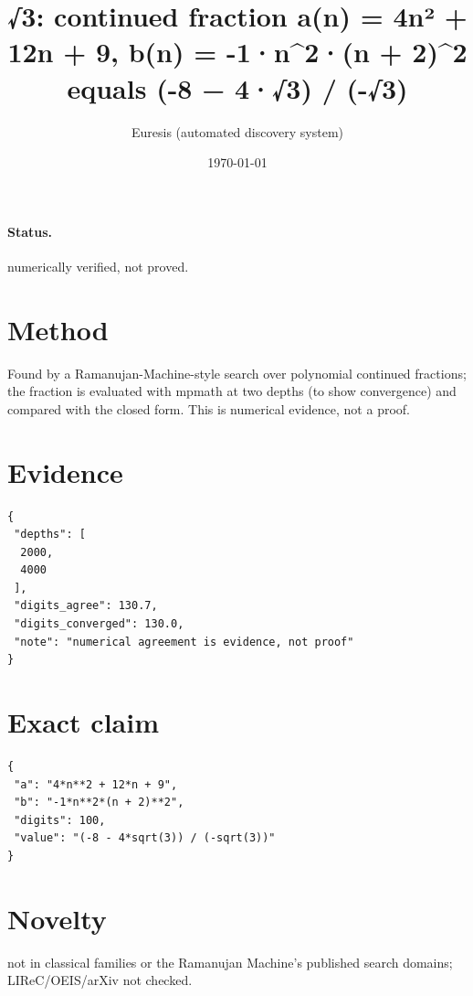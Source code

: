 \documentclass[11pt]{article}
\title{√3: continued fraction a(n) = 4n² + 12n + 9, b(n) = -1·n\^{}2·(n + 2)\^{}2 equals (-8 − 4·√3) / (-√3)}
\author{Euresis (automated discovery system)}
\date{\today}
\begin{document}
\maketitle
\paragraph{Status.} numerically verified, not proved.
\section{Method}
Found by a Ramanujan-Machine-style search over polynomial continued fractions; the fraction is evaluated with mpmath at two depths (to show convergence) and compared with the closed form. This is numerical evidence, not a proof.
\section{Evidence}
\begin{verbatim}
{
 "depths": [
  2000,
  4000
 ],
 "digits_agree": 130.7,
 "digits_converged": 130.0,
 "note": "numerical agreement is evidence, not proof"
}
\end{verbatim}
\section{Exact claim}
\begin{verbatim}
{
 "a": "4*n**2 + 12*n + 9",
 "b": "-1*n**2*(n + 2)**2",
 "digits": 100,
 "value": "(-8 - 4*sqrt(3)) / (-sqrt(3))"
}
\end{verbatim}
\section{Novelty}
not in classical families or the Ramanujan Machine's published search domains; LIReC/OEIS/arXiv not checked.
\end{document}
